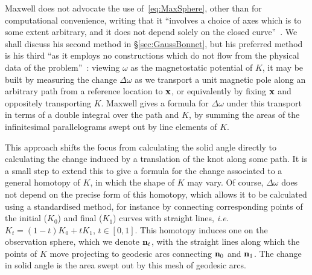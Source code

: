     Maxwell does not advocate the use of~\eqref{eq:MaxSphere}, other than for computational convenience, writing that it ``involves a choice of axes which is to some extent arbitrary, and it does not depend solely on the closed curve''~\citep[Art.~418]{Maxwell2}. We shall discuss his second method in \S\ref{sec:GaussBonnet}, but his preferred method is his third ``as it employs no constructions which do not flow from the physical data of the problem''~\citep[Art.~419]{Maxwell2}: viewing $\omega$ as the magnetostatic potential of $K$, it may be built by measuring the change $\Delta\omega$ as we transport a unit magnetic pole along an arbitrary path from a reference location to ${\bf x}$, or equivalently by fixing ${\bf x}$ and oppositely transporting $K$. Maxwell gives a formula for $\Delta\omega$ under this transport in terms of a double integral over the path and $K$, by summing the areas of the infinitesimal parallelograms swept out by line elements of $K$. 

    This approach shifts the focus from calculating the solid angle directly to calculating the change induced by a translation of the knot along some path. It is a small step to extend this to give a formula for the change associated to a general homotopy of $K$, in which the shape of $K$ may vary. Of course, $\Delta \omega$ does not depend on the precise form of this homotopy, which allows it to be calculated using a standardised method, for instance by connecting corresponding points of the initial ($K_0$) and final ($K_1$) curves with straight lines, {\sl i.e.} $K_t = (1-t) K_0 + t K_1$, $t\in [0,1]$. This homotopy induces one on the observation sphere, which we denote ${\bf n}_t$, with the straight lines along which the points of $K$ move projecting to geodesic arcs connecting ${\bf n}_0$ and ${\bf n}_1$. The change in solid angle is the area swept out by this mesh of geodesic arcs. 

